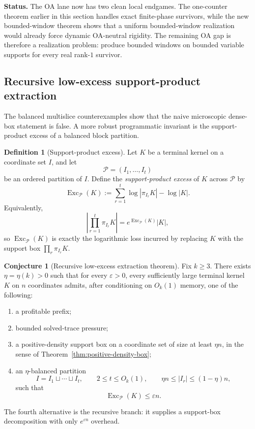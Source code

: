 \documentclass[11pt]{article}
\theoremstyle{definition}
\newtheorem{definition}[theorem]{Definition}
\newtheorem{conjecture}[theorem]{Conjecture}
\newcommand{\1}{\mathbf{1}}
\newcommand{\status}[1]{\par\smallskip\noindent\textbf{Status.} #1\par\smallskip}
\begin{document}
\status{The OA lane now has two clean local endgames. The one-counter theorem earlier in this section handles exact finite-phase survivors, while the new bounded-window theorem shows that a uniform bounded-window realization would already force dynamic OA-neutral rigidity. The remaining OA gap is therefore a realization problem: produce bounded windows on bounded variable supports for every real rank-$1$ survivor.}


\subsection*{Recursive low-excess support-product extraction}
The balanced multislice counterexamples show that the naive microscopic dense-box statement is false.
A more robust programmatic invariant is the support-product excess of a balanced block partition.

\begin{definition}[Support-product excess]\label{def:support-product-excess}
Let $K$ be a terminal kernel on a coordinate set $I$, and let
\[
\mathcal P=(I_1,\dots,I_t)
\]
be an ordered partition of $I$.
Define the \emph{support-product excess} of $K$ across $\mathcal P$ by
\[
\operatorname{Exc}_{\mathcal P}(K)
:=
\sum_{r=1}^t \log |\pi_{I_r}K|-\log |K|.
\]
Equivalently,
\[
\left|\prod_{r=1}^t \pi_{I_r}K\right|
=
e^{\operatorname{Exc}_{\mathcal P}(K)}|K|,
\]
so $\operatorname{Exc}_{\mathcal P}(K)$ is exactly the logarithmic loss incurred by replacing $K$ with the support box $\prod_r \pi_{I_r}K$.
\end{definition}

\begin{conjecture}[Recursive low-excess extraction theorem]\label{conj:low-excess-extraction}
Fix $k\ge 3$.
There exists $\eta=\eta(k)>0$ such that for every $\varepsilon>0$, every sufficiently large terminal kernel $K$ on $n$ coordinates admits, after conditioning on $O_k(1)$ memory, one of the following:
\begin{enumerate}[label=(\roman*),leftmargin=2.2em]
\item a profitable prefix;
\item bounded solved-trace pressure;
\item a positive-density support box on a coordinate set of size at least $\eta n$, in the sense of Theorem~\ref{thm:positive-density-box};
\item an $\eta$-balanced partition
\[
I=I_1\sqcup\cdots\sqcup I_t,
\qquad
2\le t\le O_k(1),
\qquad
\eta n\le |I_r|\le (1-\eta)n,
\]
such that
\[
\operatorname{Exc}_{\mathcal P}(K)\le \varepsilon n.
\]
\end{enumerate}
The fourth alternative is the recursive branch: it supplies a support-box decomposition with only $e^{\varepsilon n}$ overhead.
\end{conjecture}
\end{document}
